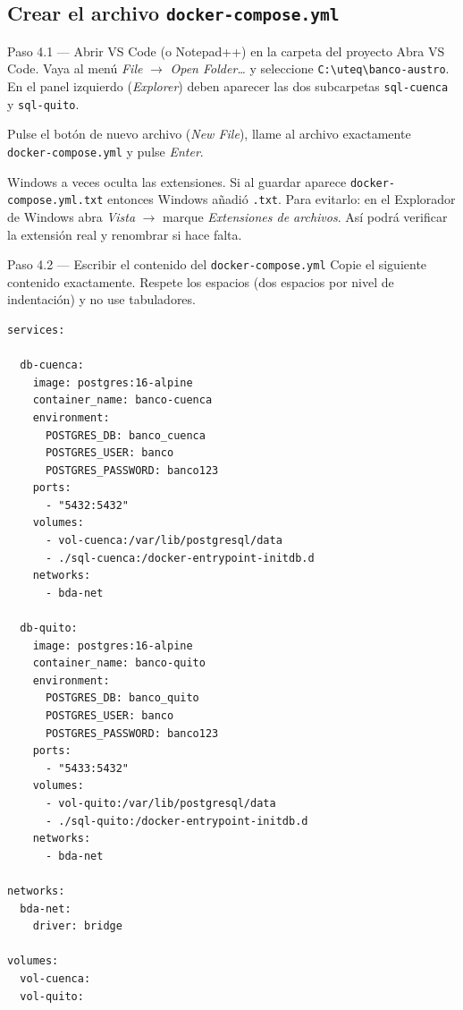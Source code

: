 \documentclass[11pt,a4paper]{article}
\begin{document}
\subsection{Crear el archivo \texttt{docker-compose.yml}}

\begin{pasobox}{Paso 4.1 --- Abrir VS Code (o Notepad++) en la carpeta del proyecto}
Abra VS Code. Vaya al men\'u \emph{File} $\rightarrow$ \emph{Open Folder\ldots} y seleccione \texttt{C:\textbackslash uteq\textbackslash banco-austro}. En el panel izquierdo (\emph{Explorer}) deben aparecer las dos subcarpetas \texttt{sql-cuenca} y \texttt{sql-quito}.

Pulse el bot\'on de nuevo archivo (\emph{New File}), llame al archivo exactamente \texttt{docker-compose.yml} y pulse \emph{Enter}.
\end{pasobox}

\begin{errorbox}
Windows a veces oculta las extensiones. Si al guardar aparece \texttt{docker-compose.yml.txt} entonces Windows a\~nadi\'o \texttt{.txt}. Para evitarlo: en el Explorador de Windows abra \emph{Vista} $\rightarrow$ marque \emph{Extensiones de archivos}. As\'i podr\'a verificar la extensi\'on real y renombrar si hace falta.
\end{errorbox}

\begin{pasobox}{Paso 4.2 --- Escribir el contenido del \texttt{docker-compose.yml}}
Copie el siguiente contenido exactamente. Respete los espacios (dos espacios por nivel de indentaci\'on) y no use tabuladores.

\begin{lstlisting}[style=yamlstyle,caption={C:\textbackslash uteq\textbackslash banco-austro\textbackslash docker-compose.yml}]
services:

  db-cuenca:
    image: postgres:16-alpine
    container_name: banco-cuenca
    environment:
      POSTGRES_DB: banco_cuenca
      POSTGRES_USER: banco
      POSTGRES_PASSWORD: banco123
    ports:
      - "5432:5432"
    volumes:
      - vol-cuenca:/var/lib/postgresql/data
      - ./sql-cuenca:/docker-entrypoint-initdb.d
    networks:
      - bda-net

  db-quito:
    image: postgres:16-alpine
    container_name: banco-quito
    environment:
      POSTGRES_DB: banco_quito
      POSTGRES_USER: banco
      POSTGRES_PASSWORD: banco123
    ports:
      - "5433:5432"
    volumes:
      - vol-quito:/var/lib/postgresql/data
      - ./sql-quito:/docker-entrypoint-initdb.d
    networks:
      - bda-net

networks:
  bda-net:
    driver: bridge

volumes:
  vol-cuenca:
  vol-quito:
\end{lstlisting}
\end{pasobox}
\end{document}
